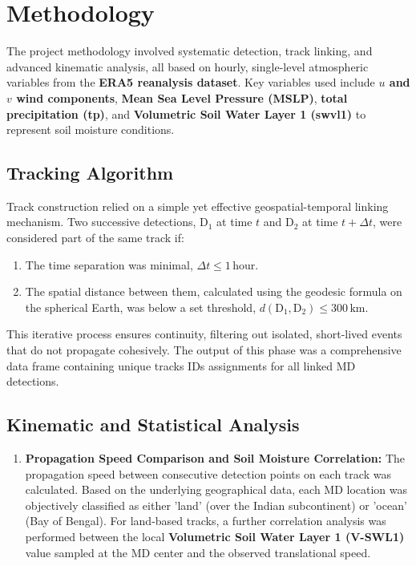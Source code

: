 \documentclass[11pt, a4paper]{article}
\begin{document}
\section{Methodology}

The project methodology involved systematic detection, track linking, and advanced kinematic analysis, all based on hourly, single-level atmospheric variables from the \textbf{ERA5 reanalysis dataset}. Key variables used include \textbf{$u$ and $v$ wind components}, \textbf{Mean Sea Level Pressure (MSLP)}, \textbf{total precipitation (tp)}, and \textbf{Volumetric Soil Water Layer 1 (swvl1)} to represent soil moisture conditions.

\subsection{Tracking Algorithm}

Track construction relied on a simple yet effective geospatial-temporal linking mechanism. Two successive detections, $\text{D}_1$ at time $t$ and $\text{D}_2$ at time $t + \Delta t$, were considered part of the same track if:

\begin{enumerate}
	\item The time separation was minimal, $\Delta t \le 1\, \text{hour}$.
	\item The spatial distance between them, calculated using the geodesic formula on the spherical Earth, was below a set threshold, $d(\text{D}_1, \text{D}_2) \le 300\, \text{km}$.
\end{enumerate}

This iterative process ensures continuity, filtering out isolated, short-lived events that do not propagate cohesively. The output of this phase was a comprehensive data frame containing unique tracks IDs assignments for all linked MD detections.

\subsection{Kinematic and Statistical Analysis}

\begin{enumerate}
	\item \textbf{Propagation Speed Comparison and Soil Moisture Correlation:} The propagation speed between consecutive detection points on each track was calculated. Based on the underlying geographical data, each MD location was objectively classified as either 'land' (over the Indian subcontinent) or 'ocean' (Bay of Bengal). For land-based tracks, a further correlation analysis was performed between the local \textbf{Volumetric Soil Water Layer 1 (V-SWL1)} value sampled at the MD center and the observed translational speed.
\end{enumerate}
\end{document}
